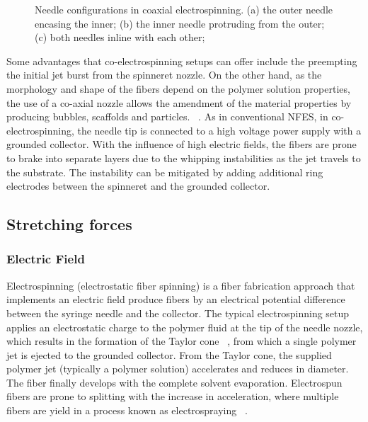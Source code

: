 \documentclass[5p,,preprint,12pt,twocolumn]{elsarticle}
\makeatletter
\def\fixFloatSize#1{}%
\makeatother
\begin{document}
\bgroup
\fixFloatSize{images/9d6b16c0-e5ec-4b60-adfa-e55a194e6694-uimg_nozzle.png}
\begin{figure}[!htbp]
\centering \makeatletter{}
\makeatother 
\caption{{Needle configurations in coaxial electrospinning. (a) the outer needle encasing the inner; (b) the inner needle protruding from the outer; (c) both needles inline with each other;}}
\label{f-e0d8f2eb18d4}
\end{figure}
\egroup
Some advantages that co-electrospinning setups can offer include the preempting the initial jet burst from the spinneret nozzle. On the other hand, as the morphology and shape of the fibers depend on the polymer solution properties, the use of a co-axial nozzle allows the amendment of the material properties by producing bubbles, scaffolds and particles. \unskip~\cite{527120:13914748,527120:13914750}. As in conventional NFES, in co-electrospinning, the needle tip is connected to a high voltage power supply with a grounded collector. With the influence of high electric fields, the fibers are prone to brake into separate layers due to the whipping instabilities as the jet travels to the substrate. The instability can be mitigated by adding additional ring electrodes between the spinneret and the grounded collector. \unskip~\cite{527120:13915304}



\subsection{Stretching forces}



\subsubsection{Electric Field}Electrospinning (electrostatic fiber spinning) is a fiber fabrication approach that implements an electric field produce fibers by an electrical potential difference between the syringe needle and the collector. The typical electrospinning setup applies an electrostatic charge to the polymer fluid at the tip of the needle nozzle, which results in the formation of the Taylor cone \unskip~\cite{527120:13659828}, from which a single polymer jet is ejected to the grounded collector. From the Taylor cone, the supplied polymer jet (typically a polymer solution) accelerates and reduces in diameter. The fiber finally develops with the complete solvent evaporation. Electrospun fibers are prone to splitting with the increase in acceleration, where multiple fibers are yield in a process known as electrospraying \unskip~\cite{527120:13659925}.
\end{document}
